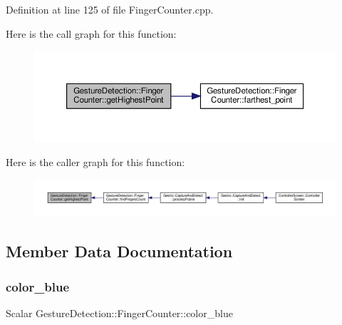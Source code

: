 Definition at line 125 of file Finger\+Counter.\+cpp.

Here is the call graph for this function\+:
\nopagebreak
\begin{figure}[H]
\begin{center}
\leavevmode
\includegraphics[width=350pt]{class_gesture_detection_1_1_finger_counter_a54c1d13833b837d08bcd45c489494370_cgraph}
\end{center}
\end{figure}
Here is the caller graph for this function\+:
\nopagebreak
\begin{figure}[H]
\begin{center}
\leavevmode
\includegraphics[width=350pt]{class_gesture_detection_1_1_finger_counter_a54c1d13833b837d08bcd45c489494370_icgraph}
\end{center}
\end{figure}


\subsection{Member Data Documentation}
\mbox{\label{class_gesture_detection_1_1_finger_counter_a0081a8ce412b872f627f8540baeddd19}} 
\subsubsection{\texorpdfstring{color\+\_\+blue}{color\_blue}}
{\footnotesize\ttfamily Scalar Gesture\+Detection\+::\+Finger\+Counter\+::color\+\_\+blue\hspace{0.3cm}{\ttfamily [private]}}



